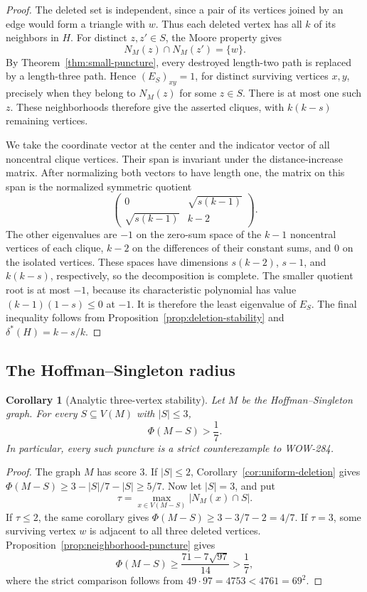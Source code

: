 \documentclass[a4paper,10pt,reqno]{amsart}
\theoremstyle{plain}
\newtheorem{corollary}[theorem]{Corollary}
\theoremstyle{definition}
\theoremstyle{remark}
\begin{document}
\begin{proof}
The deleted set is independent, since a pair of its vertices joined by an
edge would form a triangle with \(w\).  Thus each deleted vertex has all
\(k\) of its neighbors in \(H\).  For distinct \(z,z'\in S\), the Moore
property gives
\[
 N_M(z)\cap N_M(z')=\{w\}.
\]
By Theorem~\ref{thm:small-puncture}, every destroyed length-two path is
replaced by a length-three path.  Hence \((E_S)_{xy}=1\), for distinct
surviving vertices \(x,y\), precisely when they belong to \(N_M(z)\) for
some \(z\in S\).  There is at most one such \(z\).  These neighborhoods
therefore give the asserted cliques, with \(k(k-s)\) remaining vertices.

We take the coordinate vector at the center and the indicator vector of
all noncentral clique vertices.  Their span is invariant under the
distance-increase matrix.  After normalizing both vectors to have length one,
the matrix on this span is the normalized symmetric quotient
\[
 \begin{pmatrix}
 0&\sqrt{s(k-1)}\\
 \sqrt{s(k-1)}&k-2
 \end{pmatrix}.
\]
The other eigenvalues are \(-1\) on the zero-sum space of the \(k-1\)
noncentral vertices of each clique, \(k-2\) on the differences of their
constant sums, and \(0\) on the isolated vertices.  These spaces have
dimensions \(s(k-2)\), \(s-1\), and \(k(k-s)\), respectively, so the
decomposition is complete.  The smaller quotient root is at most \(-1\), because its
characteristic polynomial has value \((k-1)(1-s)\le0\) at \(-1\).
It is therefore the least eigenvalue of \(E_S\).
The final inequality follows from Proposition~\ref{prop:deletion-stability}
and \(\delta^*(H)=k-s/k\).
\end{proof}

\subsection{The Hoffman--Singleton radius}
\label{sec:robustness}

\begin{corollary}[Analytic three-vertex stability]
\label{cor:analytic-three-puncture}
Let \(M\) be the Hoffman--Singleton graph.  For every
\(S\subseteq V(M)\) with \(|S|\le3\),
\[
 \Phi(M-S)>\frac17.
\]
In particular, every such puncture is a strict counterexample to WOW-284.
\end{corollary}

\begin{proof}
The graph \(M\) has score \(3\).  If \(|S|\le2\),
Corollary~\ref{cor:uniform-deletion} gives
\(\Phi(M-S)\ge3-|S|/7-|S|\ge5/7\).
Now let \(|S|=3\), and put
\[
 \tau=\max_{x\in V(M-S)}|N_M(x)\cap S|.
\]
If \(\tau\le2\), the same corollary gives
\(\Phi(M-S)\ge3-3/7-2=4/7\).
If \(\tau=3\), some surviving vertex \(w\) is adjacent to all three
deleted vertices.  Proposition~\ref{prop:neighborhood-puncture} gives
\[
 \Phi(M-S)\ge\frac{71-7\sqrt{97}}{14}>\frac17,
\]
where the strict comparison follows from
\(49\cdot97=4753<4761=69^2\).
\end{proof}
\end{document}
